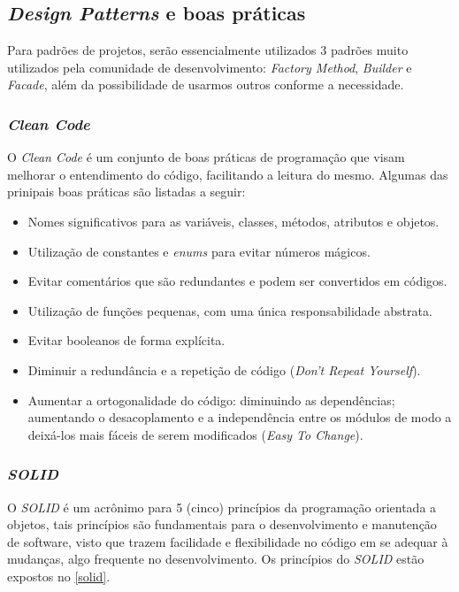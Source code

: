 \subsection{\textit{Design Patterns} e boas práticas}
Para padrões de projetos, serão essencialmente utilizados 3 padrões muito utilizados pela comunidade de desenvolvimento: \emph{Factory Method}, \emph{Builder} e \emph{Facade}, além da possibilidade de usarmos outros conforme a necessidade.

\subsubsection{\textit{Clean Code}}
O \textit{Clean Code} é um conjunto de boas práticas de programação que visam melhorar o entendimento do código, facilitando a leitura do mesmo. Algumas das prinipais boas práticas são listadas a seguir:

\begin{itemize}
    \item Nomes significativos para as variáveis, classes, métodos, atributos e objetos.
    \item Utilização de constantes e \textit{enums} para evitar números mágicos.
    \item Evitar comentários que são redundantes e podem ser convertidos em códigos.
    \item Utilização de funções pequenas, com uma única responsabilidade abstrata.
    \item Evitar booleanos de forma explícita.
    \item Diminuir a redundância e a repetição de código (\textit{Don't Repeat Yourself}).
    \item Aumentar a ortogonalidade do código: diminuindo as dependências; aumentando o desacoplamento e a independência entre os módulos de modo a deixá-los mais fáceis de serem modificados (\textit{Easy To Change}).
\end{itemize}

\subsubsection{\textit{SOLID}}

O \textit{SOLID} é um acrônimo para 5 (cinco) princípios da programação orientada a objetos, tais princípios são fundamentais para o desenvolvimento e manutenção de software, visto que trazem facilidade e flexibilidade no código em se adequar à mudanças, algo frequente no desenvolvimento. Os princípios do \textit{SOLID} estão expostos no \autoref{solid}.

